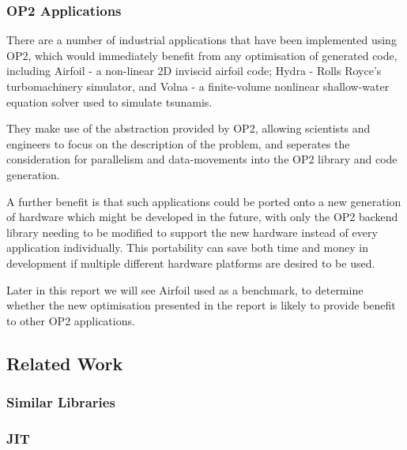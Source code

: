 \subsubsection{OP2 Applications}
There are a number of industrial applications that have been implemented using OP2, which would immediately benefit from any optimisation of generated code, including Airfoil \cite{airfoil} - a non-linear 2D inviscid airfoil code; Hydra \cite{hydra} - Rolls Royce’s turbomachinery simulator, and Volna \cite{volna} - a finite-volume nonlinear shallow-water equation solver used to simulate tsunamis.
\par
They make use of the abstraction provided by OP2, allowing scientists and engineers to focus on the description of the problem, and seperates the consideration for parallelism and data-movements into the OP2 library and code generation.
\par
A further benefit is that such applications could be ported onto a new generation of hardware which might be developed in the future, with only the OP2 backend library needing to be modified to support the new hardware instead of every application individually. This portability can save both time and money in development if multiple different hardware platforms are desired to be used.
\par
Later in this report we will see Airfoil used as a benchmark, to determine whether the new optimisation presented in the report is likely to provide benefit to other OP2 applications.

\subsection{Related Work}

\subsubsection{Similar Libraries}

\subsubsection{JIT}
\label{sec:rw_JIT}
